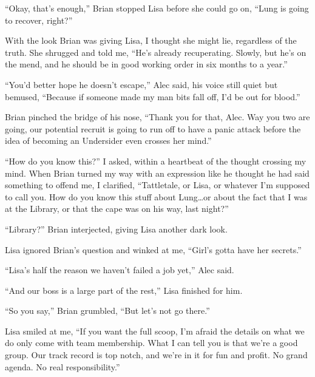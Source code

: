 ``Okay, that's enough,'' Brian stopped Lisa before she could go on, ``Lung is going to recover, right?''



With the look Brian was giving Lisa, I thought she might lie, regardless of the truth.  She shrugged and told me, ``He's already recuperating.  Slowly, but he's on the mend, and he should be in good working order in six months to a year.''



``You'd better hope he doesn't escape,'' Alec said, his voice still quiet but bemused, ``Because if someone made my man bits fall off, I'd be out for blood.''



Brian pinched the bridge of his nose, ``Thank you for that, Alec.  Way you two are going, our potential recruit is going to run off to have a panic attack before the idea of becoming an Undersider even crosses her mind.''



``How do you know this?'' I asked, within a heartbeat of the thought crossing my mind.  When Brian turned my way with an expression like he thought he had said something to offend me, I clarified, ``Tattletale, or Lisa, or whatever I'm supposed to call you.  How do you know this stuff about Lung\ldots or about the fact that I was at the Library, or that the cape was on his way, last night?''



``Library?'' Brian interjected, giving Lisa another dark look.



Lisa ignored Brian's question and winked at me, ``Girl's gotta have her secrets.''



``Lisa's half the reason we haven't failed a job yet,'' Alec said.



``And our boss is a large part of the rest,'' Lisa finished for him.



``So you say,'' Brian grumbled, ``But let's not go there.''



Lisa smiled at me, ``If you want the full scoop, I'm afraid the details on what we do only come with team membership.  What I can tell you is that we're a good group.  Our track record is top notch, and we're in it for fun and profit.  No grand agenda.  No real responsibility.''



